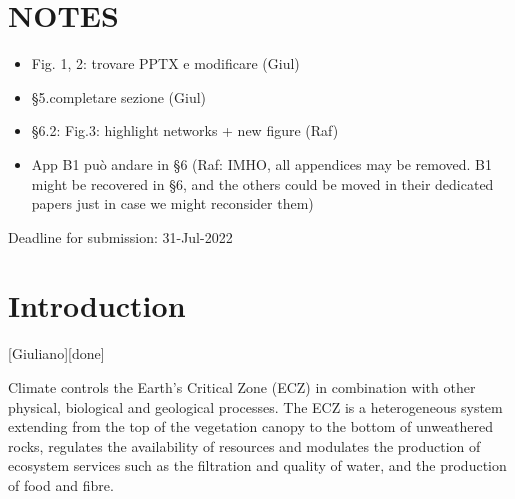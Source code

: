 \documentclass[authoryear,preprint,review,12pt]{elsarticle}
\begin{document}
\section{NOTES}
\begin{itemize}
    \item Fig. 1, 2: trovare PPTX e modificare (Giul)
    \item §5.completare sezione (Giul)
    \item §6.2: Fig.3: highlight networks + new figure (Raf)
    \item App B1 può andare in §6 (Raf: IMHO, all appendices may be removed. B1 might be recovered in §6, and the others could be moved in their dedicated papers just in case we might reconsider them)
\end{itemize}

Deadline for submission: 31-Jul-2022

\section{Introduction}[Giuliano][done]



Climate controls the Earth's Critical Zone (ECZ) in combination with other physical, biological and geological processes.
The ECZ is a heterogeneous system extending from the top of the vegetation canopy to the bottom of unweathered rocks, regulates the availability of resources and modulates the production of ecosystem services such as the filtration and quality of water, and the production of food and fibre.
\end{document}
